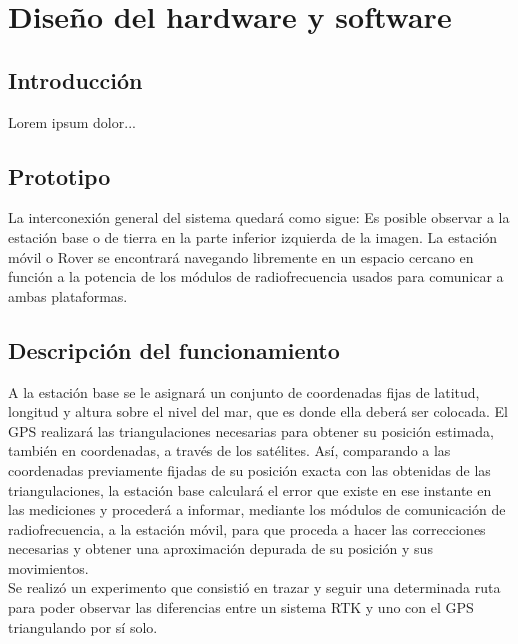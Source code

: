 
\chapter{Diseño del hardware y software}
\label{Chap:DisHard} %


\section{Introducción}

Lorem ipsum dolor...

\section{Prototipo}

La interconexión general del sistema quedará como sigue: Es posible observar a la estación base o de tierra en la parte inferior izquierda de la imagen. La estación móvil o Rover se encontrará navegando libremente en un espacio cercano en función a la potencia de los módulos de radiofrecuencia usados para comunicar a ambas plataformas.

\section{Descripción del funcionamiento}

A la estación base se le asignará un conjunto de coordenadas fijas de latitud, longitud y altura sobre el nivel del mar, que es donde ella deberá ser colocada. El GPS realizará las triangulaciones necesarias para obtener su posición estimada, también en coordenadas, a través de los satélites. Así, comparando a las coordenadas previamente fijadas de su posición exacta con las obtenidas de las triangulaciones, la estación base calculará el
error que existe en ese instante en las mediciones y procederá a informar, mediante los módulos de comunicación de radiofrecuencia, a la estación móvil, para que proceda a hacer las correcciones necesarias y obtener una aproximación depurada de su posición y sus movimientos. \\

Se realizó un experimento que consistió en trazar y seguir una determinada ruta para poder observar las diferencias entre un sistema RTK y uno con el GPS triangulando por sí solo. \\


